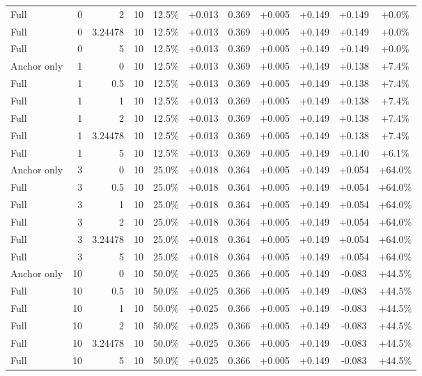 \begin{table}[htbp]
\begin{tabular}{lrrrccccccc}
Full & 0 & 2 & 10 & 12.5\% & +0.013 & 0.369 & +0.005 & +0.149 & +0.149 & +0.0\% \\
Full & 0 & 3.24478 & 10 & 12.5\% & +0.013 & 0.369 & +0.005 & +0.149 & +0.149 & +0.0\% \\
Full & 0 & 5 & 10 & 12.5\% & +0.013 & 0.369 & +0.005 & +0.149 & +0.149 & +0.0\% \\
Anchor only & 1 & 0 & 10 & 12.5\% & +0.013 & 0.369 & +0.005 & +0.149 & +0.138 & +7.4\% \\
Full & 1 & 0.5 & 10 & 12.5\% & +0.013 & 0.369 & +0.005 & +0.149 & +0.138 & +7.4\% \\
Full & 1 & 1 & 10 & 12.5\% & +0.013 & 0.369 & +0.005 & +0.149 & +0.138 & +7.4\% \\
Full & 1 & 2 & 10 & 12.5\% & +0.013 & 0.369 & +0.005 & +0.149 & +0.138 & +7.4\% \\
Full & 1 & 3.24478 & 10 & 12.5\% & +0.013 & 0.369 & +0.005 & +0.149 & +0.138 & +7.4\% \\
Full & 1 & 5 & 10 & 12.5\% & +0.013 & 0.369 & +0.005 & +0.149 & +0.140 & +6.1\% \\
Anchor only & 3 & 0 & 10 & 25.0\% & +0.018 & 0.364 & +0.005 & +0.149 & +0.054 & +64.0\% \\
Full & 3 & 0.5 & 10 & 25.0\% & +0.018 & 0.364 & +0.005 & +0.149 & +0.054 & +64.0\% \\
Full & 3 & 1 & 10 & 25.0\% & +0.018 & 0.364 & +0.005 & +0.149 & +0.054 & +64.0\% \\
Full & 3 & 2 & 10 & 25.0\% & +0.018 & 0.364 & +0.005 & +0.149 & +0.054 & +64.0\% \\
Full & 3 & 3.24478 & 10 & 25.0\% & +0.018 & 0.364 & +0.005 & +0.149 & +0.054 & +64.0\% \\
Full & 3 & 5 & 10 & 25.0\% & +0.018 & 0.364 & +0.005 & +0.149 & +0.054 & +64.0\% \\
Anchor only & 10 & 0 & 10 & 50.0\% & +0.025 & 0.366 & +0.005 & +0.149 & -0.083 & +44.5\% \\
Full & 10 & 0.5 & 10 & 50.0\% & +0.025 & 0.366 & +0.005 & +0.149 & -0.083 & +44.5\% \\
Full & 10 & 1 & 10 & 50.0\% & +0.025 & 0.366 & +0.005 & +0.149 & -0.083 & +44.5\% \\
Full & 10 & 2 & 10 & 50.0\% & +0.025 & 0.366 & +0.005 & +0.149 & -0.083 & +44.5\% \\
Full & 10 & 3.24478 & 10 & 50.0\% & +0.025 & 0.366 & +0.005 & +0.149 & -0.083 & +44.5\% \\
Full & 10 & 5 & 10 & 50.0\% & +0.025 & 0.366 & +0.005 & +0.149 & -0.083 & +44.5\% \\

\end{tabular}
\end{table}
